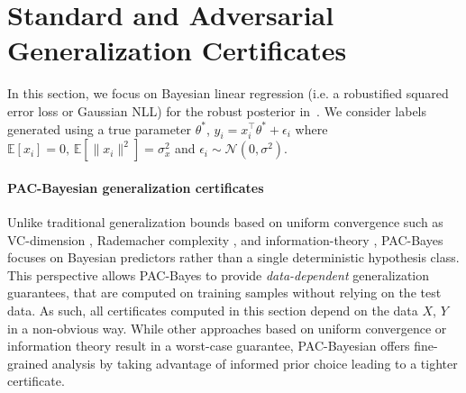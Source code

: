 \section{Standard and Adversarial Generalization Certificates}
\label{sec:pac_bayes_certs}
In this section, we focus on Bayesian linear regression (i.e. a robustified squared error loss or Gaussian NLL) for the robust posterior in~.
We consider labels generated using a true parameter $\theta^*$,  $y_i=x_i^\top \theta^* + \epsilon_i$ where $\mathbb{E}[x_i] = 0, \, \mathbb{E}[\|x_i\|^2] = \sigma_x^2$ and $\epsilon_i \sim \mathcal{N}(0,\sigma^2)$. %

\paragraph{PAC-Bayesian generalization certificates} 
Unlike traditional generalization bounds based on uniform convergence such as VC-dimension \citep{vapnik1971uniform}, Rademacher complexity \citep{shalev2014understanding}, and information-theory \citep{zhang2006information}, PAC-Bayes \citep{mcallester1998some} focuses on Bayesian predictors %
rather than a single deterministic hypothesis class. This perspective allows PAC-Bayes to provide \emph{data-dependent} generalization guarantees, 
that are computed on training samples without relying on the test data. 
As such, all certificates computed in this section depend on the data $X$, $Y$ in a non-obvious way.
While other approaches based on uniform convergence or information theory result in a worst-case guarantee, PAC-Bayesian offers fine-grained analysis by taking advantage of informed prior choice leading to a tighter certificate. 

